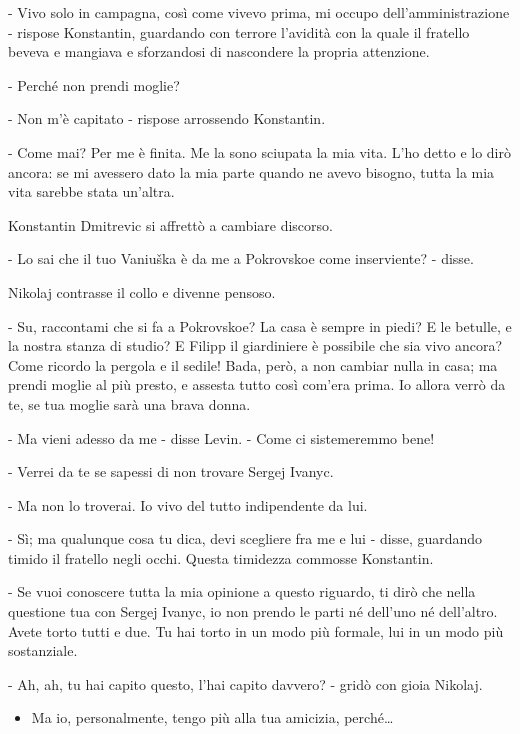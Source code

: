 - Vivo solo in campagna, così come vivevo prima, mi occupo dell'amministrazione - rispose Konstantin, guardando con terrore l'avidità con la quale il fratello beveva e mangiava e sforzandosi di nascondere la propria attenzione. 

- Perché non prendi moglie? 

- Non m'è capitato - rispose arrossendo Konstantin. 

- Come mai? Per me è finita. Me la sono sciupata la mia vita. L'ho detto e lo dirò ancora: se mi avessero dato la mia parte quando ne avevo bisogno, tutta la mia vita sarebbe stata un'altra. 

Konstantin Dmitrevic si affrettò a cambiare discorso. 

- Lo sai che il tuo Vaniuška è da me a Pokrovskoe come inserviente? - disse. 

Nikolaj contrasse il collo e divenne pensoso. 

- Su, raccontami che si fa a Pokrovskoe? La casa è sempre in piedi? E le betulle, e la nostra stanza di studio? E Filipp il giardiniere è possibile che sia vivo ancora? Come ricordo la pergola e il sedile! Bada, però, a non cambiar nulla in casa; ma prendi moglie al più presto, e assesta tutto così com'era prima. Io allora verrò da te, se tua moglie sarà una brava donna. 

- Ma vieni adesso da me - disse Levin. - Come ci sistemeremmo bene! 

- Verrei da te se sapessi di non trovare Sergej Ivanyc. 

- Ma non lo troverai. Io vivo del tutto indipendente da lui. 

- Sì; ma qualunque cosa tu dica, devi scegliere fra me e lui - disse, guardando timido il fratello negli occhi. Questa timidezza commosse Konstantin. 

- Se vuoi conoscere tutta la mia opinione a questo riguardo, ti dirò che nella questione tua con Sergej Ivanyc, io non prendo le parti né dell'uno né dell'altro. Avete torto tutti e due. Tu hai torto in un modo più formale, lui in un modo più sostanziale. 

- Ah, ah, tu hai capito questo, l'hai capito davvero? - gridò con gioia Nikolaj. 

\begin{itemize} \itemsep1pt\parskip0pt \item Ma io, personalmente, tengo più alla tua amicizia, perché\ldots{} \end{itemize} 

